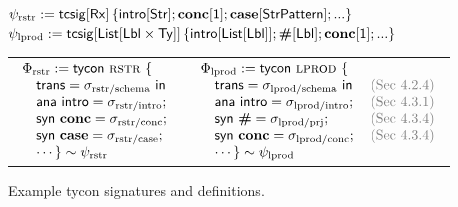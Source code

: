 \begin{figure}\small
$\psi_\text{rstr} := \tcsig{\krx}{\introsig{\keyw{Str}}; \opname{conc}[\kunit]; \opname{case}[\keyw{StrPattern}]; ...}$\\
$\psi_\text{lprod} := \tcsig{\klist{\klbl\times\kty}}{\introsig{\klist{\klbl}}; \opname{\#}[\klbl]; \opname{conc}[\kunit]; ...}$\\

\vspace{-5px}\hspace{-10px}\begin{tabular}{l|ll}
$\begin{array}{l}\Phi_\text{rstr} := \tcdef{\tcvar{rstr}}{\psi_\text{rstr}}{\\
\quad\tcstruct{\stx{rstr/schema}}{\\
\quad\tcstructn{\stx{rstr/intro}}};\\
\quad\keyw{syn}~\opname{conc} = \stx{rstr/conc};\\
\quad\keyw{syn}~\opname{case} = \stx{rstr/case};\\
\quad\cdots}\end{array}$ & $\begin{array}{l}\Phi_\text{lprod} := \tcdef{\tcvar{lprod}}{\psi_\text{lprod}}{\\
\quad\tcstruct{\stx{lprod/schema}}{\\
\quad\tcstructn{\stx{lprod/intro}}};\\
\quad\keyw{syn}~\opname{\#} = \stx{lprod/prj};\\
\quad\keyw{syn}~\opname{conc} = \stx{lprod/conc};\\
\quad\cdots}\end{array}$ & $\begin{array}{l}
~\\
\hspace{-12px}\text{\color{gray} (Sec 4.2.4)}\\
\hspace{-12px}\text{\color{gray} (Sec 4.3.1)}\\
\hspace{-12px}\text{\color{gray} (Sec 4.3.4)}\\
\hspace{-12px}\text{\color{gray} (Sec 4.3.4)}\\
~\end{array}
$
\end{tabular}\vspace{0px}
\caption{Example tycon signatures and definitions.}
\label{fig:example-tycons}
\end{figure}

